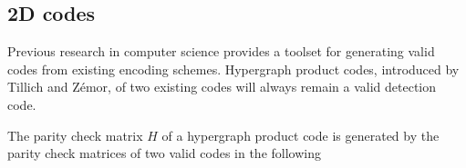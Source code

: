 \subsection{2D codes}
Previous research in computer science 
provides a toolset for generating valid codes
from existing encoding schemes. 
Hypergraph product codes, introduced by Tillich and Z\'emor,
of two 
existing codes will always remain a valid detection code.

The parity check matrix $H$ of a hypergraph product code is generated
by the parity check matrices of two valid codes in the following






